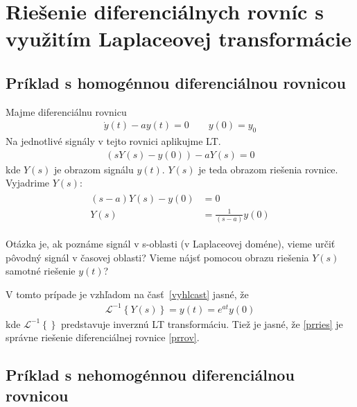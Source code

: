 \documentclass[a4paper, 10pt, ]{article}
\begin{document}
\section{Riešenie diferenciálnych rovníc s využitím Laplaceovej transformácie}

\subsection{Príklad s homogénnou diferenciálnou rovnicou}

Majme diferenciálnu rovnicu
\begin{align}  \label{prrov}
    \dot y(t) - a y(t) = 0 \qquad y(0) = y_0
\end{align}
Na jednotlivé signály v tejto rovnici aplikujme LT.
\begin{align}
    \left( s Y(s) - y(0)  \right) - a Y(s) = 0
\end{align}
kde $Y(s)$ je obrazom signálu $y(t)$. $Y(s)$ je teda obrazom riešenia rovnice. Vyjadrime $Y(s)$:
\begin{align}
    \begin{aligned}
        (s-a)Y(s) - y(0) &= 0 \\
        Y(s) &= \frac{1}{(s-a)} y(0)
    \end{aligned}
\end{align}

Otázka je, ak poznáme signál v s-oblasti (v Laplaceovej doméne), vieme určiť pôvodný signál v časovej oblasti? Vieme nájsť pomocou obrazu riešenia $Y(s)$ samotné riešenie $y(t)$?

V tomto prípade je vzhľadom na časť~\ref{vyhlcast} jasné, že
\begin{align} \label{prries}
    \mathcal L ^{-1} \left\{ Y(s) \right\} = y(t) = e^{at}y(0)
\end{align}
kde $\mathcal L ^{-1} \left\{  \right\}$ predstavuje  inverznú LT transformáciu. Tiež je jasné, že \eqref{prries} je správne riešenie diferenciálnej rovnice \eqref{prrov}.






\subsection{Príklad s nehomogénnou diferenciálnou rovnicou}
\end{document}
